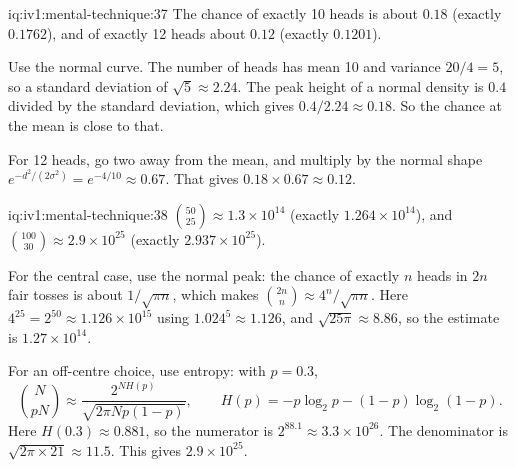 \begin{solution}{iq:iv1:mental-technique:37}
The chance of exactly 10 heads is about $0.18$ (exactly $0.1762$), and of exactly 12 heads about $0.12$ (exactly $0.1201$).

Use the normal curve. The number of heads has mean 10 and variance $20/4 = 5$, so a standard deviation of $\sqrt 5 \approx 2.24$. The peak height of a normal density is $0.4$ divided by the standard deviation, which gives $0.4/2.24 \approx 0.18$. So the chance at the mean is close to that.

For 12 heads, go two away from the mean, and multiply by the normal shape $e^{-d^2/(2\sigma^2)} = e^{-4/10} \approx 0.67$. That gives $0.18 \times 0.67 \approx 0.12$.

\end{solution}

\begin{solution}{iq:iv1:mental-technique:38}
$\binom{50}{25} \approx 1.3 \times 10^{14}$ (exactly $1.264 \times 10^{14}$), and $\binom{100}{30} \approx 2.9 \times 10^{25}$ (exactly $2.937 \times 10^{25}$).

For the central case, use the normal peak: the chance of exactly $n$ heads in $2n$ fair tosses is about $1/\sqrt{\pi n}$, which makes $\binom{2n}{n} \approx 4^n / \sqrt{\pi n}$. Here $4^{25} = 2^{50} \approx 1.126 \times 10^{15}$ using $1.024^5 \approx 1.126$, and $\sqrt{25\pi} \approx 8.86$, so the estimate is $1.27 \times 10^{14}$.

For an off-centre choice, use entropy: with $p = 0.3$,
\[
\binom{N}{pN} \approx \frac{2^{N H(p)}}{\sqrt{2\pi N p (1 - p)}}, \qquad H(p) = -p \log_2 p - (1 - p) \log_2 (1 - p).
\]
Here $H(0.3) \approx 0.881$, so the numerator is $2^{88.1} \approx 3.3 \times 10^{26}$. The denominator is $\sqrt{2\pi \times 21} \approx 11.5$. This gives $2.9 \times 10^{25}$.

\end{solution}

